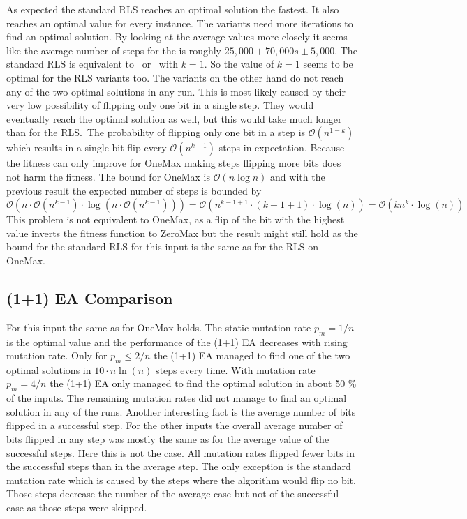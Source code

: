As expected the standard RLS reaches an optimal solution the fastest.
It also reaches an optimal value for every instance.
The \RLSR[s] variants need more iterations to find an optimal solution.
By looking at the average values more closely it seems like the average number of steps for the \RLSR[s] is roughly $25,000 + 70,000s \pm 5,000$.
The standard RLS is equivalent to \RLSR~or \RLSN~with $k=1$.
So the value of $k=1$ seems to be optimal for the RLS variants too.
The \RLSN[b] variants on the other hand do not reach any of the two optimal solutions in any run.
This is most likely caused by their very low possibility of flipping only one bit in a single step.
They would eventually reach the optimal solution as well, but this would take much longer than for the RLS.\
The probability of flipping only one bit in a step is $\mathcal{O}(n^{1-k})$ which results in a single bit flip every $\mathcal{O}(n^{k-1})$ steps in expectation.
Because the fitness can only improve for OneMax making steps flipping more bits does not harm the fitness.
The bound for OneMax is $\mathcal{O}(n\log n)$ and with the previous result the expected number of steps is bounded by
$\mathcal{O}(n\cdot\mathcal{O}(n^{k-1})\cdot \log(n\cdot\mathcal{O}(n^{k-1}))) 
=\mathcal{O}(n^{k-1+1}\cdot (k-1+1)\cdot\log(n))
=\mathcal{O}(kn^{k}\cdot\log(n))$
This problem is not equivalent to OneMax, as a flip of the bit with the highest value inverts the fitness function to ZeroMax but the result might still hold as the bound for the standard RLS for this input is the same as for the RLS on OneMax.
\subsection{(1+1) EA Comparison}


For this input the same as for OneMax holds. 
The static mutation rate $p_m=1/n$ is the optimal value and the performance of the (1+1) EA decreases with rising mutation rate.
Only for $p_m\le2/n$ the (1+1) EA managed to find one of the two optimal solutions in $10 \cdot n\ln(n)$ steps every time.
With mutation rate $p_m=4/n$ the (1+1) EA only managed to find the optimal solution in about 50 \% of the inputs.
The remaining mutation rates did not manage to find an optimal solution in any of the runs.
Another interesting fact is the average number of bits flipped in a successful step.
For the other inputs the overall average number of bits flipped in any step was mostly the same as for the average value of the successful steps. Here this is not the case.
All mutation rates flipped fewer bits in the successful steps than in the average step.
The only exception is the standard mutation rate which is caused by the steps where the algorithm would flip no bit.
Those steps decrease the number of the average case but not of the successful case as those steps were skipped.

